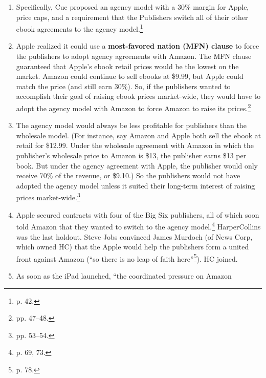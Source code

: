 \begin{enumerate}
\begin{enumerate}
        agreements with the publishers continued to use the wholesale model, 
        because Amazon could continue to undercut Apple's prices.  ``To ensure 
        that the iBookstore would be competitive at higher prices, Apple 
        concluded that it needed to eliminate all retail price competition. 
        Thus, the final component of its agency model required the Publishers to 
        move all of their e-tailers to agency.''\footnote{pp. 39--40.}
        \item Specifically, Cue proposed an agency model with a 30\% margin for 
        Apple, price caps, and a requirement that the Publishers switch all of 
        their other ebook agreements to the agency model.\footnote{p. 42.}
        \item Apple realized it could use a \textbf{most-favored nation (MFN) 
        clause} to force the publishers to adopt agency agreements with Amazon. 
        The MFN clause guaranteed that Apple's ebook retail prices would be the 
        lowest on the market. Amazon could continue to sell ebooks at \$9.99, 
        but Apple could match the price (and still earn 30\%). So, if the 
        publishers wanted to accomplish their goal of raising ebook prices 
        market-wide, they would have to adopt the agency model with Amazon to 
        force Amazon to raise its prices.\footnote{pp. 47--48.}
        \item The agency model would always be less profitable for publishers 
        than the wholesale model. (For instance, say Amazon and Apple both sell 
        the ebook at retail for \$12.99. Under the wholesale agreement with 
        Amazon in which the publisher's wholesale price to Amazon is \$13, the 
        publisher earns \$13 per book. But under the agency agreement with 
        Apple, the publisher would only receive 70\% of the revenue, or \$9.10.) 
        So the publishers would not have adopted the agency model unless it 
        suited their long-term interest of raising prices 
        market-wide.\footnote{pp. 53--54.}
        \item Apple secured contracts with four of the Big Six publishers, all 
        of which soon told Amazon that they wanted to switch to the agency 
        model.\footnote{p. 69, 73.} HarperCollins was the last holdout. Steve 
        Jobs convinced James Murdoch (of News Corp, which owned HC) that the 
        Apple would help the publishers form a united front against Amazon 
        (``so there is no leap of faith here''\footnote{p. 78.}). HC joined.
        \item As soon as the iPad launched, ``the coordinated pressure on Amazon 

\end{enumerate}
\end{enumerate}
